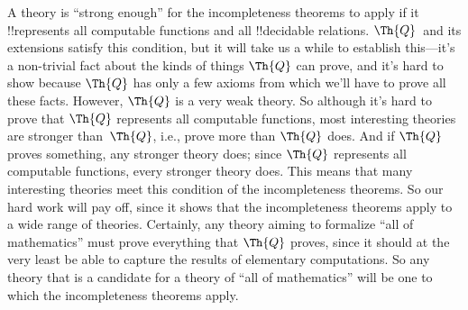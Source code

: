 \documentclass[../../../include/open-logic-section]{subfiles}
\begin{document}
A theory is ``strong enough'' for the incompleteness theorems to
apply if it !!{represents} all computable functions and all
!!{decidable} relations. $\Th{Q}$~and its extensions satisfy this
condition, but it will take us a while to establish this---it's a
non-trivial fact about the kinds of things $\Th{Q}$ can prove, and
it's hard to show because $\Th{Q}$ has only a few axioms from which
we'll have to prove all these facts. However, $\Th{Q}$ is a very weak
theory. So although it's hard to prove that $\Th{Q}$ represents all
computable functions, most interesting theories are stronger
than~$\Th{Q}$, i.e., prove more than $\Th{Q}$ does. And if $\Th{Q}$
proves something, any stronger theory does; since $\Th{Q}$ represents
all computable functions, every stronger theory does. This means that
many interesting theories meet this condition of the incompleteness
theorems. So our hard work will pay off, since it shows that the
incompleteness theorems apply to a wide range of theories. Certainly,
any theory aiming to formalize ``all of mathematics'' must prove
everything that $\Th{Q}$ proves, since it should at the very least be
able to capture the results of elementary computations.  So any theory
that is a candidate for a theory of ``all of mathematics'' will be one
to which the incompleteness theorems apply.
\end{document}
